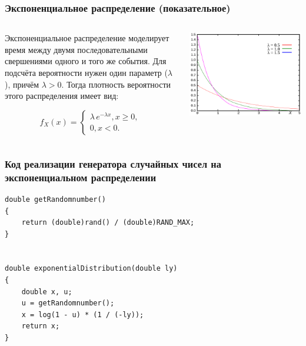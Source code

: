 \documentclass{beamer}
\begin{document}
\begin{frame}
\frametitle{Экспоненциальное распределение (показательное)}
\begin{columns}[T]
\begin{column}{0.6\textwidth}
Экспоненциальное распределение моделирует время между двумя последовательными свершениями одного и того же события.
Для подсчёта вероятности нужен один параметр ($\lambda$), причём $\lambda > 0$. Тогда плотность вероятности этого распределения
имеет вид:

\begin{equation*}
f_{X}(x) = 
 \begin{cases}
   \lambda\,e^{{-\lambda x}}, x\ge 0, \\
   0, x<0.
 \end{cases}
\end{equation*}
\end{column}
\begin{column}{0.5\textwidth}
\includegraphics[width=\textwidth]{1280px-Exponential_distribution_pdf.svg.png}
\end{column}
\end{columns}
\end{frame}


\begin{frame}[fragile]
\frametitle{Код реализации генератора случайных чисел на экспоненциальном распределении}
\begin{verbatim}
double getRandomnumber()
{
	return (double)rand() / (double)RAND_MAX;
}


double exponentialDistribution(double ly)
{
	double x, u;
	u = getRandomnumber();
	x = log(1 - u) * (1 / (-ly));
	return x;
}
\end{verbatim}
\end{frame}
\end{document}
